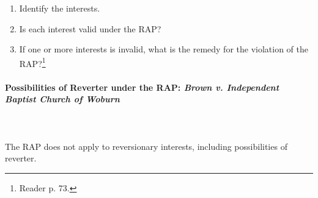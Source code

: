 \begin{enumerate}
    \item Identify the interests.
    \item Is each interest valid under the RAP?
    \item If one or more interests is invalid, what is the remedy for the 
    violation of the RAP?\footnote{Reader p. 73.}
\end{enumerate}

\paragraph{Possibilities of Reverter under the RAP: \emph{Brown v. Independent 
Baptist Church of Woburn}}
~\\\\
The RAP does not apply to reversionary interests, including possibilities of 
reverter.

